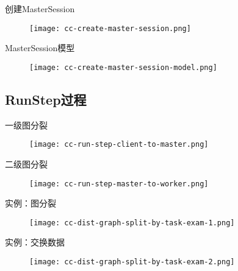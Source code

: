 \begin{frame}{创建MasterSession}
  \begin{figure}
    \centering
    \texttt{[image: cc-create-master-session.png]}
  \end{figure}
\end{frame}

\begin{frame}{MasterSession模型}
  \begin{figure}
    \centering
    \texttt{[image: cc-create-master-session-model.png]}
  \end{figure}
\end{frame}

\subsection{RunStep过程}

\begin{frame}{一级图分裂}
  \begin{figure}
    \centering
    \texttt{[image: cc-run-step-client-to-master.png]}
  \end{figure}
\end{frame}

\begin{frame}{二级图分裂}
  \begin{figure}
    \centering
    \texttt{[image: cc-run-step-master-to-worker.png]}
  \end{figure}
\end{frame}

\begin{frame}{实例：图分裂}
  \begin{figure}
    \centering
    \texttt{[image: cc-dist-graph-split-by-task-exam-1.png]}
  \end{figure}
\end{frame}

\begin{frame}{实例：交换数据}
  \begin{figure}
    \centering
    \texttt{[image: cc-dist-graph-split-by-task-exam-2.png]}
  \end{figure}
\end{frame}
